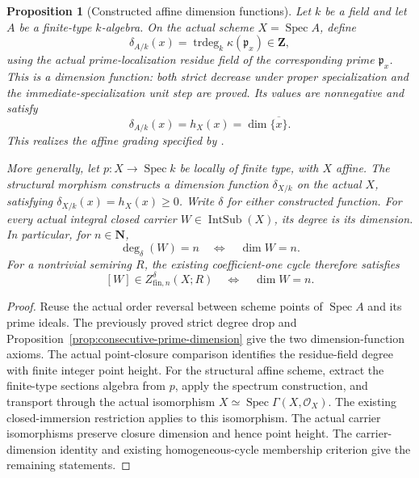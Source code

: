 \documentclass[11pt]{article}
\newtheorem{proposition}[theorem]{Proposition}
\theoremstyle{definition}
\theoremstyle{remark}
\DeclareMathOperator{\Spec}{Spec}
\begin{document}
\begin{proposition}[Constructed affine dimension functions]
\label{prop:affine-dimension-function}
Let \(k\) be a field and let \(A\) be a finite-type \(k\)-algebra.
On the actual scheme \(X=\Spec A\), define
\[
  \delta_{A/k}(x)
    =\operatorname{trdeg}_k\kappa(\mathfrak p_x)\in\mathbf Z,
\]
using the actual prime-localization residue field of the corresponding
prime \(\mathfrak p_x\). This is a dimension function: both strict
decrease under proper specialization and the immediate-specialization
unit step are proved. Its values are nonnegative and satisfy
\[
  \delta_{A/k}(x)=h_X(x)=\dim\overline{\{x\}}.
\]
This realizes the affine grading specified by
\cite{StacksDimensionFunction,StacksAlgebraicSchemeDimension}.

More generally, let \(p:X\to\Spec k\) be locally of finite type,
with \(X\) affine. The structural morphism constructs a dimension
function \(\delta_{X/k}\) on the actual \(X\), satisfying \(\delta_{X/k}(x)=h_X(x)\geq0\).
Write \(\delta\) for either constructed function. For every actual
integral closed carrier \(W\in\operatorname{IntSub}(X)\), its degree
is its dimension.
In particular, for \(n\in\mathbf N\),
\[
  \deg_\delta(W)=n\quad\Longleftrightarrow\quad\dim W=n.
\]
For a nontrivial semiring \(R\), the existing coefficient-one cycle
therefore satisfies
\[
  [W]\in Z^{\delta}_{\mathrm{fin},n}(X;R)
    \quad\Longleftrightarrow\quad\dim W=n.
\]
\end{proposition}

\begin{proof}
Reuse the actual order reversal between scheme points of \(\Spec A\)
and its prime ideals. The previously proved strict degree drop and
Proposition~\ref{prop:consecutive-prime-dimension} give the two
dimension-function axioms. The actual point-closure comparison
identifies the residue-field degree with finite integer point height.
For the structural affine scheme, extract the finite-type sections
algebra from \(p\), apply the spectrum construction, and transport
through the actual isomorphism \(X\simeq\Spec\Gamma(X,\mathcal O_X)\).
The existing closed-immersion restriction applies to this isomorphism.
The actual carrier isomorphisms preserve closure dimension and hence
point height. The carrier-dimension identity and existing homogeneous-cycle
membership criterion give the remaining statements.
\end{proof}
\end{document}
